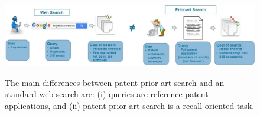 
\begin{figure}[htpb]
   \centering
   \includegraphics[width=\textwidth,height=35mm]{figs/webprior.jpg}
   \caption{The main differences between patent prior-art search and an standard web search are: (i) queries are reference patent
applications, and (ii) patent prior art search is a recall-oriented task.}  
   \label{fig:compareappr} 
\end{figure}
\FloatBarrier
